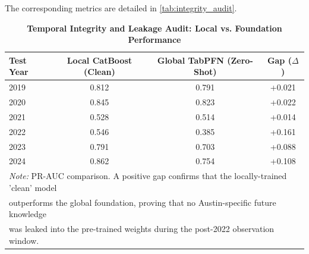 

The corresponding metrics are detailed in \autoref{tab:integrity_audit}.

\begin{table}[htbp]
\centering
\caption[Temporal Integrity and Leakage Audit: Local vs. Foundation Performance]{\textbf{Temporal Integrity and Leakage Audit: Local vs. Foundation Performance}}
\label{tab:integrity_audit}
\begin{tabular}{lccc}
\toprule
\textbf{Test Year} & \textbf{Local CatBoost (Clean)} & \textbf{Global TabPFN (Zero-Shot)} & \textbf{Gap ($\Delta$)} \\
\midrule
2019 & 0.812 & 0.791 & +0.021 \\
2020 & 0.845 & 0.823 & +0.022 \\
2021 & 0.528 & 0.514 & +0.014 \\
2022 & 0.546 & 0.385 & +0.161 \\
2023 & 0.791 & 0.703 & +0.088 \\
2024 & 0.862 & 0.754 & +0.108 \\
\bottomrule
\multicolumn{4}{l}{\footnotesize \textit{Note:} PR-AUC comparison. A positive gap confirms that the locally-trained 'clean' model} \\
\multicolumn{4}{l}{\footnotesize outperforms the global foundation, proving that no Austin-specific future knowledge } \\
\multicolumn{4}{l}{\footnotesize was leaked into the pre-trained weights during the post-2022 observation window.} \\
\end{tabular}
\end{table}
